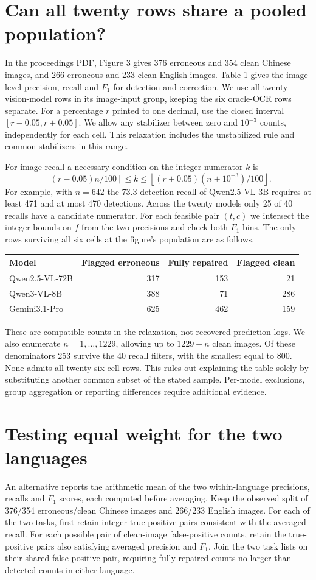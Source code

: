 \documentclass[11pt]{article}
\begin{document}
\section{Can all twenty rows share a pooled population?}
In the proceedings PDF, Figure 3 gives 376 erroneous and 354 clean Chinese images, and 266 erroneous and 233 clean English images. Table 1 gives the image-level precision, recall and $F_1$ for detection and correction. We use all twenty vision-model rows in its image-input group, keeping the six oracle-OCR rows separate. For a percentage $r$ printed to one decimal, use the closed interval $[r-0.05,r+0.05]$. We allow any stabilizer between zero and $10^{-3}$ counts, independently for each cell. This relaxation includes the unstabilized rule and common stabilizers in this range.

For image recall a necessary condition on the integer numerator $k$ is
\[
 \left\lceil (r-0.05)n/100\right\rceil \le k\le
 \left\lfloor (r+0.05)(n+10^{-3})/100\right\rfloor .
\]
For example, with $n=642$ the 73.3 detection recall of Qwen2.5-VL-3B requires at least 471 and at most 470 detections. Across the twenty models only 25 of 40 recalls have a candidate numerator. For each feasible pair $(t,c)$ we intersect the integer bounds on $f$ from the two precisions and check both $F_1$ bins. The only rows surviving all six cells at the figure's population are as follows.
\begin{center}\begin{tabular}{lrrr}\toprule Model & Flagged erroneous & Fully repaired & Flagged clean\\\midrule
Qwen2.5-VL-72B &317&153&21\\
Qwen3-VL-8B &388&71&286\\
Gemini3.1-Pro &625&462&159\\\bottomrule\end{tabular}\end{center}
These are compatible counts in the relaxation, not recovered prediction logs. We also enumerate $n=1,\ldots,1229$, allowing up to $1229-n$ clean images. Of these denominators 253 survive the 40 recall filters, with the smallest equal to 800. None admits all twenty six-cell rows. This rules out explaining the table solely by substituting another common subset of the stated sample. Per-model exclusions, group aggregation or reporting differences require additional evidence.


\section{Testing equal weight for the two languages}
An alternative reports the arithmetic mean of the two within-language precisions, recalls and $F_1$ scores, each computed before averaging. Keep the observed split of 376/354 erroneous/clean Chinese images and 266/233 English images. For each of the two tasks, first retain integer true-positive pairs consistent with the averaged recall. For each possible pair of clean-image false-positive counts, retain the true-positive pairs also satisfying averaged precision and $F_1$. Join the two task lists on their shared false-positive pair, requiring fully repaired counts no larger than detected counts in either language.
\end{document}
